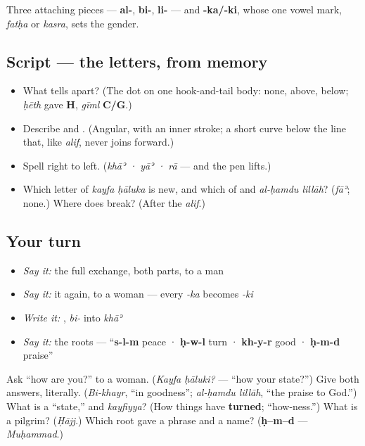 Three attaching pieces — \textbf{al-}, \textbf{bi-}, \textbf{li-} — and \textbf{-ka/-ki}, whose one vowel mark, \emph{fatḥa} or \emph{kasra}, sets the gender.

\subsection*{Script — the letters, from memory}
\begin{itemize}
\raggedright
  \item What tells \textbf{  } apart? (The dot on one hook-and-tail body: none, above, below; \emph{ḥēth} gave \textbf{H}, \emph{gīml} \textbf{C/G}.)
  \item Describe \textbf{} and \textbf{}. (Angular, with an inner stroke; a short curve below the line that, like \emph{alif}, never joins forward.)
  \item Spell \textbf{} right to left. (\emph{khāʾ · yāʾ · rā} — and the pen lifts.)
  \item Which letter of \emph{kayfa ḥāluka} is new, and which of \textbf{} and \emph{al-ḥamdu lillāh}? (\emph{fāʾ}; none.) Where does \textbf{} break? (After the \emph{alif}.)
\end{itemize}

\subsection*{Your turn}
\begin{itemize}
\raggedright
  \item \emph{Say it:} the full exchange, both parts, to a man
  \item \emph{Say it:} it again, to a woman — every \emph{-ka} becomes \emph{-ki}
  \item \emph{Write it:} \textbf{}, \emph{bi-} into \emph{khāʾ}
  \item \emph{Say it:} the roots — \textquotedblleft{}\textbf{s-l-m} peace · \textbf{ḥ-w-l} turn · \textbf{kh-y-r} good · \textbf{ḥ-m-d} praise\textquotedblright{}
\end{itemize}

\begin{tcolorbox}[breakable,colback=teal!4,colframe=teal!35!black,title={Before you move on}]
Ask \textquotedblleft{}how are you?\textquotedblright{} to a woman. (\emph{Kayfa ḥāluki?} — \textquotedblleft{}how your state?\textquotedblright{}) Give both answers, literally. (\emph{Bi-khayr}, \textquotedblleft{}in goodness\textquotedblright{}; \emph{al-ḥamdu lillāh}, \textquotedblleft{}the praise to God.\textquotedblright{}) What is a \textquotedblleft{}state,\textquotedblright{} and \emph{kayfiyya}? (How things have \textbf{turned}; \textquotedblleft{}how-ness.\textquotedblright{}) What is a pilgrim? (\emph{Ḥājj}.) Which root gave a phrase and a name? (\textbf{ḥ–m–d} — \emph{Muḥammad}.)
\end{tcolorbox}
